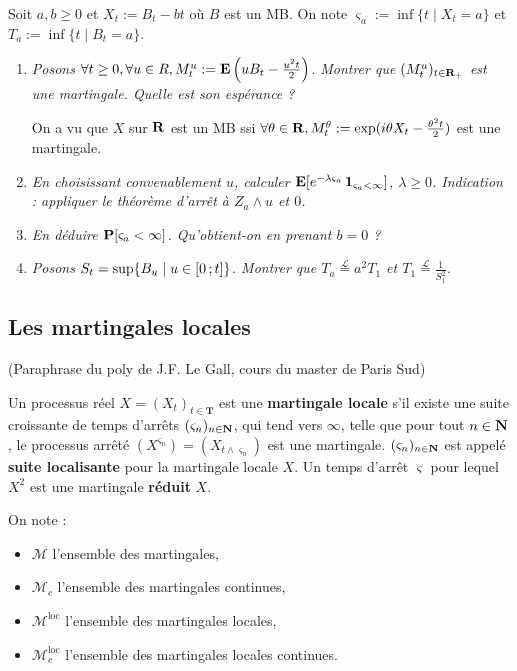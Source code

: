 	\begin{ex}
		Soit $a, b \geq 0$ et $X_t := B_t - bt$ où $B$ est un MB.
		On note $\varsigma_a := \inf \{ t \mid X_t = a \}$ et $T_a := \inf \{ t \mid B_t = a \}$.
		\begin{enumerate}[1)]
			\item \textit{Posons $\forall t \geq 0, \forall u \in R, M_t^u := \mathbf{E} \left( u B_t - \frac{u^2 t}{2} \right)$.
				Montrer que $(M_t^u)_{t \in \mathbf{R}_+}$ est une martingale.
				Quelle est son espérance ?}
				
				On a vu que $X$ sur $\mathbf{R}$ est un MB ssi $\forall \theta \in \mathbf{R}, M_t^\theta := \exp (i \theta X_t - \frac{\theta^2 t}{2})$ est une martingale.
			\item \textit{En choisissant convenablement $u$, calculer $\mathbf{E}[e^{-\lambda \varsigma_a} \operatorname{\mathbf{1}}_{\varsigma_a < \infty}]$, $\lambda \geq 0$.
				Indication : appliquer le théorème d'arrêt à $Z_a \wedge u$ et $0$.}
				
			\item \textit{En déduire $\mathbf{P}[\varsigma_a < \infty]$.
				Qu'obtient-on en prenant $b = 0$ ?}
				
			\item \textit{Posons $S_t = \sup \{ B_u \mid u \in \mathopen{}\mathclose{\left[0\mathclose{}\mathpunct{};t\right]} \}$.
				Montrer que $T_a \overset{\mathcal{L}}{=} a^2 T_1$ et $T_1 \overset{\mathcal{L}}{=} \frac{1}{S_1^2}$.}
		\end{enumerate}
	\end{ex}


\subsection{Les martingales locales}

	(Paraphrase du poly de J.F. Le Gall, cours du master de Paris Sud)
	
	\begin{defn}
		Un processus réel $X = (X_t)_{t \in \mathbf{T}}$ est une \textbf{martingale locale} s'il existe une suite croissante de temps d'arrêts $(\varsigma_n)_{n \in \mathbf{N}}$, qui tend vers $\infty$, telle que pour tout $n \in \mathbf{N}$, le processus arrêté $(X^{\varsigma_n}) = (X_{t \wedge \varsigma_n})$ est une martingale.
		$(\varsigma_n)_{n \in \mathbf{N}}$ est appelé \textbf{suite localisante} pour la martingale locale $X$.
		Un temps d'arrêt $\varsigma$ pour lequel $X^2$ est une martingale \textbf{réduit} $X$.
	\end{defn}
	
	\begin{note}
		On note :
		\begin{itemize}
			\item[\textbullet] $\mathcal{M}$ l'ensemble des martingales,
			\item[\textbullet] $\mathcal{M}_c$ l'ensemble des martingales continues,
			\item[\textbullet] $\mathcal{M}^{\text{loc}}$ l'ensemble des martingales locales,
			\item[\textbullet] $\mathcal{M}^{\text{loc}}_c$ l'ensemble des martingales locales continues.
		\end{itemize}
	\end{note}
	
